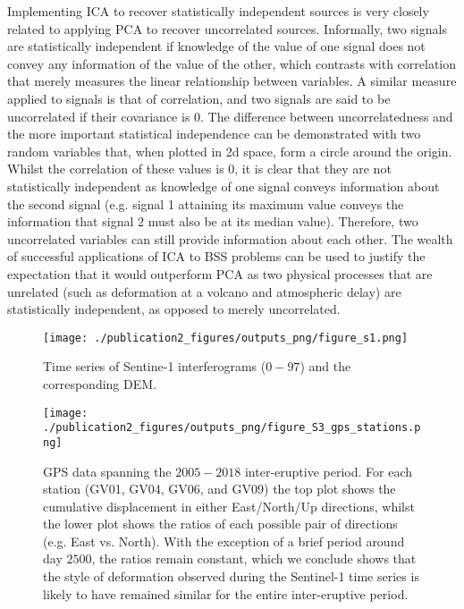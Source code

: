 Implementing ICA  to recover statistically independent sources is very closely related to applying PCA to recover uncorrelated sources.  Informally, two signals are statistically independent if knowledge of the value of one signal does not convey any information of the value of the other, which contrasts with correlation that merely measures the linear relationship between variables.  A similar measure applied to signals is that of correlation, and two signals are said to be uncorrelated if their covariance is $0$.  The difference between uncorrelatedness and the more important statistical independence can be demonstrated with two random variables that, when plotted in 2d space, form a circle around the origin.  Whilst the correlation of these values is 0, it is clear that they are not statistically independent as knowledge of one signal conveys information about the second signal (e.g. signal 1 attaining its maximum value conveys the information that signal 2 must also be at its median value).  Therefore, two uncorrelated variables can still provide information about each other.  The wealth of successful applications of ICA to BSS problems can be used to justify the expectation that it would outperform PCA as two physical processes that are unrelated (such as deformation at a volcano and atmospheric delay) are statistically independent, as opposed to merely uncorrelated.  


\begin{figure}[]
	\centering 
 	\texttt{[image: ./publication2\_figures/outputs\_png/figure\_s1.png]}
	\caption[Sierra Negra interferograms]{Time series of Sentine-1 interferograms ($0-97$) and the corresponding DEM.   }
	\label{fig:s1}
\end{figure}

\begin{figure}[]
	\centering 
 	\texttt{[image: ./publication2\_figures/outputs\_png/figure\_S3\_gps\_stations.png]}
	\caption[Sierra Negra GPS data]{GPS data spanning the $2005 - 2018$ inter-eruptive period.  For each station (GV01, GV04, GV06, and GV09) the top plot shows the cumulative displacement in either East/North/Up directions, whilst the lower plot shows the ratios of each possible pair of directions (e.g. East vs. North).  With the exception of a brief period around day $2500$, the ratios remain constant, which we conclude shows that the style of deformation observed during the Sentinel-1 time series is likely to have remained similar for the entire inter-eruptive period.    }
	\label{fig:s2}
\end{figure}

